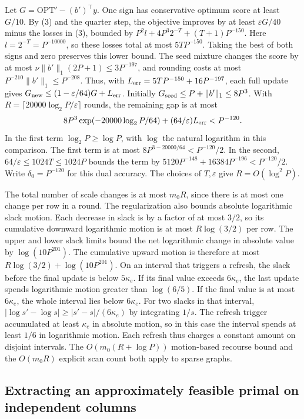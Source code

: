 \documentclass[11pt]{article}
\begin{document}
Let \(G=\mathrm{OPT}'-(b')^\top y\). One sign has conservative optimum score at least \(G/10\). By (3) and the quarter step, the objective improves by at least \(\varepsilon G/40\) minus the losses in (3), bounded by \(P^2 l+4P^3 2^{-T}+(T+1)P^{-150}\). Here \(l=2^{-T}=P^{-10000}\), so these losses total at most \(5TP^{-150}\). Taking the best of both signs and zero preserves this lower bound. The seed mixture changes the score by at most \(\nu\|b'\|_1(2P+1)\le3P^{-197}\), and rounding costs at most \(P^{-210}\|b'\|_1\le P^{-208}\). Thus, with \(L_{\rm err}=5TP^{-150}+16P^{-197}\), each full update gives \(G_{\rm new}\le(1-\varepsilon/64)G+L_{\rm err}\). Initially \(G_{\rm seed}\le P+\|b'\|_1\le8P^3\). With \(R=\lceil 20000\log_2 P/\varepsilon\rceil\) rounds, the remaining gap is at most
\[
 8P^3 \exp(-20000\log_2 P/64)+(64/\varepsilon)L_{\rm err}<P^{-120}.
\]
In the first term \(\log_2 P\ge\log P\), with \(\log\) the natural logarithm in this comparison. The first term is at most \(8P^{3-20000/64}<P^{-120}/2\). In the second, \(64/\varepsilon\le1024T\le1024P\) bounds the term by \(5120P^{-148}+16384P^{-196}<P^{-120}/2\). Write \(\delta_0=P^{-120}\) for this dual accuracy. The choices of \(T,\varepsilon\) give \(R=O(\log^2 P)\).

The total number of scale changes is at most \(m_0R\), since there is at most one change per row in a round. The regularization also bounds absolute logarithmic slack motion. Each decrease in slack is by a factor of at most \(3/2\), so its cumulative downward logarithmic motion is at most \(R\log(3/2)\) per row. The upper and lower slack limits bound the net logarithmic change in absolute value by \(\log(10P^{201})\). The cumulative upward motion is therefore at most \(R\log(3/2)+\log(10P^{201})\). On an interval that triggers a refresh, the slack before the final update is below \(5\kappa_e\). If its final value exceeds \(6\kappa_e\), the last update spends logarithmic motion greater than \(\log(6/5)\). If the final value is at most \(6\kappa_e\), the whole interval lies below \(6\kappa_e\). For two slacks in that interval, \(|\log s'-\log s|\ge |s'-s|/(6\kappa_e)\) by integrating \(1/s\). The refresh trigger accumulated at least \(\kappa_e\) in absolute motion, so in this case the interval spends at least \(1/6\) in logarithmic motion. Each refresh thus charges a constant amount on disjoint intervals. The \(O(m_0(R+\log P))\) motion-based recourse bound and the \(O(m_0 R)\) explicit scan count both apply to sparse graphs.

\hypertarget{extracting-an-approximately-feasible-primal-on-independent-columns}{%
\subsection*{Extracting an approximately feasible primal on independent columns}\label{extracting-an-approximately-feasible-primal-on-independent-columns}}
\end{document}
